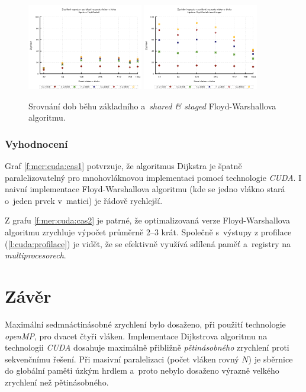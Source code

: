\begin{figure}
    \centering
    \includegraphics[width=0.45\textwidth]{../grafy/03_cuda/03-02-Floyd_v1_zrychleni_unzoom}
    \includegraphics[width=0.45\textwidth]{../grafy/03_cuda/03-02-Floyd_v2_zrychleni}
    \caption{Srovnání dob běhu základního a~\emph{shared \& staged} Floyd-Warshallova algoritmu.}
    \label{f:mer:cuda:zrychleni2}
\end{figure}


\subsubsection{Vyhodnocení}
Graf \ref{f:mer:cuda:cas1} potvrzuje, že algoritmus Dijkstra je špatně paralelizovatelný pro mnohovláknovou implementaci pomocí technologie \emph{CUDA}. I naivní implementace Floyd-Warshallova algoritmu (kde se jedno vlákno stará o~jeden prvek v~matici) je řádově rychlejší.

Z grafu \ref{f:mer:cuda:cas2} je patrné, že optimalizovaná verze Floyd-Warshallova algoritmu zrychluje výpočet průměrně 2--3 krát. Společně s~výstupy z profilace (\ref{l:cuda:profilace}) je vidět, že se efektivně využívá sdílená paměť a~registry na \emph{multiprocesorech}. 



\section{Závěr}
Maximální sedmnáctinásobné zrychlení bylo dosaženo, při použití technologie \emph{openMP}, pro dvacet čtyři vláken.
Implementace Dijkstrova algoritmu na technologii \emph{CUDA} dosahuje maximálně přibližně \emph{pětinásobného} zrychlení proti sekvenčnímu řešení. Při masivní paralelizaci (počet vláken rovný $N$) je sběrnice do globální paměti úzkým hrdlem a~proto nebylo dosaženo výrazně velkého zrychlení než pětinásobného. 


